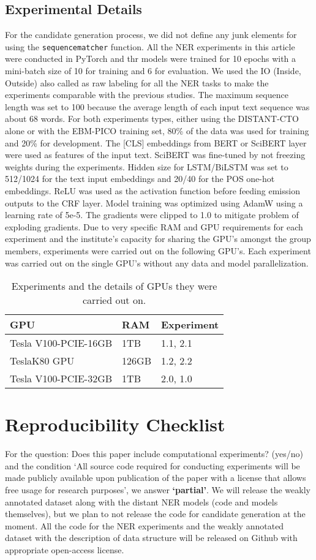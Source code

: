 \documentclass[letterpaper]{article} %
\begin{document}
\subsection{Experimental Details}
\label{app:expdet}
%
For the candidate generation process, we did not define any junk elements for using the {\tt sequencematcher} function.
All the NER experiments in this article were conducted in PyTorch and thr models were trained for 10 epochs with a mini-batch size of 10 for training and 6 for evaluation.
We used the IO (Inside, Outside) also called as raw labeling for all the NER tasks to make the experiments comparable with the previous studies.
The maximum sequence length was set to 100 because the average length of each input text sequence was about 68 words.
For both experiments types, either using the DISTANT-CTO alone or with the EBM-PICO training set, 80\% of the data was used for training and 20\% for development.
The [CLS] embeddings from BERT or SciBERT layer were used as features of the input text.
SciBERT was fine-tuned by not freezing weights during the experiments.
Hidden size for LSTM/BiLSTM was set to 512/1024 for the text input embeddings and 20/40 for the POS one-hot embeddings.
ReLU was used as the activation function before feeding emission outputs to the CRF layer.
Model training was optimized using AdamW using a learning rate of 5e-5.
The gradients were clipped to 1.0 to mitigate problem of exploding gradients.
Due to very specific RAM and GPU requirements for each experiment and the institute's capacity for sharing the GPU's amongst the group members, experiments were carried out on the following GPU's.
Each experiment was carried out on the single GPU's without any data and model parallelization.
%
%
\begin{table}[htp]
\centering
\begin{tabular}{l|l|l}
\hline 
\textbf{GPU} & \textbf{RAM} & \textbf{ Experiment }  \\
\hline
Tesla V100-PCIE-16GB & 1TB  & 1.1, 2.1\\
TeslaK80 GPU & 126GB & 1.2, 2.2\\
Tesla V100-PCIE-32GB & 1TB   & 2.0, 1.0\\
\hline
\end{tabular}
\caption{Experiments and the details of GPUs they were carried out on.}
\label{table:exp_gpu} 
\end{table}
%
%
%
\section{Reproducibility Checklist}
\label{check}
%
For the question: Does this paper include computational experiments? (yes/no) and the condition `All source code required for conducting experiments will be made publicly available upon publication of the paper with a license that allows free usage for research purposes', we answer \textbf{`partial'}.
We will release the weakly annotated dataset along with the distant NER models (code and models themselves), but we plan to not release the code for candidate generation at the moment.
All the code for the NER experiments and the weakly annotated dataset with the description of data structure will be released on Github with appropriate open-access license.
%
%
%
\end{document}
